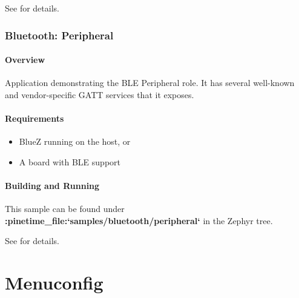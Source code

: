 \documentclass[letterpaper,10pt,english]{sphinxmanual}
\begin{document}
See {\hyperref[\detokenize{samples/bluetooth/bluetooth:bluetooth-samples}]{}} for details.


\subsection{Bluetooth: Peripheral}
\label{\detokenize{samples/bluetooth/peripheral/README:bluetooth-peripheral}}\label{\detokenize{samples/bluetooth/peripheral/README:ble-peripheral}}\label{\detokenize{samples/bluetooth/peripheral/README::doc}}

\subsubsection{Overview}
\label{\detokenize{samples/bluetooth/peripheral/README:overview}}
Application demonstrating the BLE Peripheral role. It has several well-known and
vendor-specific GATT services that it exposes.


\subsubsection{Requirements}
\label{\detokenize{samples/bluetooth/peripheral/README:requirements}}\begin{itemize}
\item {} 
BlueZ running on the host, or

\item {} 
A board with BLE support

\end{itemize}


\subsubsection{Building and Running}
\label{\detokenize{samples/bluetooth/peripheral/README:building-and-running}}
This sample can be found under {\color{red}\bfseries{}:pinetime\_file:{}`samples/bluetooth/peripheral{}`} in the
Zephyr tree.

See {\hyperref[\detokenize{samples/bluetooth/bluetooth:bluetooth-samples}]{}} for details.


\chapter{Menuconfig}
\label{\detokenize{menuconfig:menuconfig}}\label{\detokenize{menuconfig::doc}}
\end{document}
